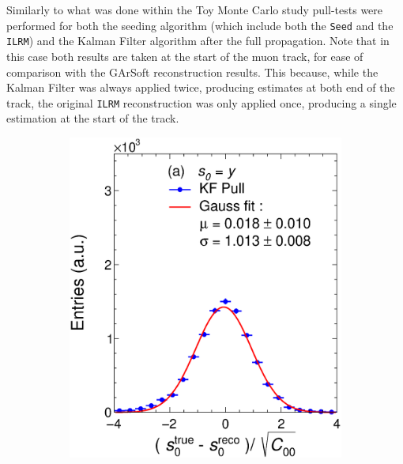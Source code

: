 Similarly to what was done within the Toy Monte Carlo study pull-tests were performed for both the seeding algorithm (which include both the \texttt{Seed} and the \texttt{ILRM}) and the Kalman Filter algorithm after the full propagation. Note that in this case both results are taken at the start of the muon track, for ease of comparison with the GArSoft reconstruction results. This because, while the Kalman Filter was always applied twice, producing estimates at both end of the track, the original \texttt{ILRM} reconstruction was only applied once, producing a single estimation at the start of the track. 


\begin{figure}[t]
     \centering
     \begin{subfigure}{0.32\textwidth}
         \centering
         \includegraphics[width=\textwidth]{figures/ch4-KF_NDGArLite/MC/ALICE+KF/UnitKFEnd_p0.eps}
         \caption{}
         \label{fig:resp0KF_GArLite_ALICE+KF}
     \end{subfigure}
     \begin{subfigure}{0.32\textwidth}
         \centering

\end{subfigure}
\end{figure}
